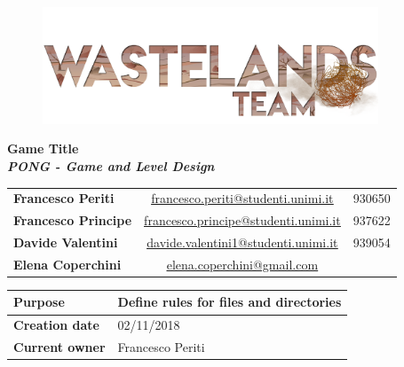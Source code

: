 \documentclass[12pt]{article}
\begin{document}
\begin{center}
  \begin{figure}[H]
  \centering
  \vspace*{5\baselineskip}
  \includegraphics[width=10cm]{Images/Logos/logoTeam}
  \end{figure}

  \vspace{50pt}
  {\huge \textbf{Game Title}} \\
  {\large \textbf{ \textit{PONG - Game and Level Design}}}
\end{center}

\vspace{20pt}
\begin{table}[H]
  \centering
  \begin{tabular}{lcr}
    \textbf{Francesco Periti}	& \underline{\href{mailto:francesco.periti@studenti.unimi.it}{francesco.periti@studenti.unimi.it}}	& 930650 \\
    \textbf{Francesco Principe}	& \underline{\href{mailto:francesco.principe@studenti.unimi.it}{francesco.principe@studenti.unimi.it}}	& 937622 \\
    \textbf{Davide Valentini}	& \underline{\href{mailto:davide.valentini1@studenti.unimi.it}{davide.valentini1@studenti.unimi.it}}	& 939054 \\
    \textbf{Elena Coperchini}	& \underline{\href{mailto:elena.coperchini@gmail.com}{elena.coperchini@gmail.com}}			& \\
  \end{tabular}
\end{table}


  \vspace{10pt}
\begin{table}[H]
  \centering
  \begin{tabular}{|l|l|}
    \hline
    \cellcolor{lightgray}\textbf{Purpose} &  Define rules for files and directories \\\hline
    \cellcolor{lightgray}\textbf{Creation date} & 02/11/2018 \\\hline
    \cellcolor{lightgray}\textbf{Current owner} & Francesco Periti \\\hline
  \end{tabular}
\end{table}
\end{document}
